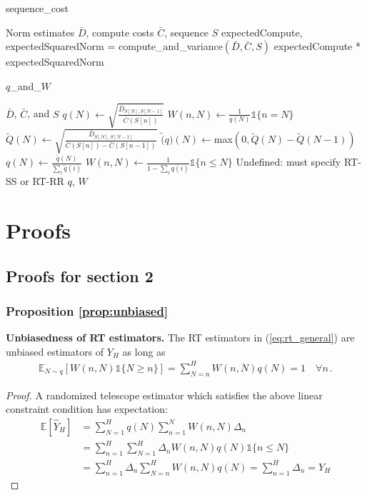 \begin{algorithm}[H]
   \caption{sequence\_cost}
   \label{alg:cost}
\begin{algorithmic}
    Norm estimates $\bar{D}$, compute costs $\bar{C}$, sequence $S$
   \STATE expectedCompute, expectedSquaredNorm = compute\_and\_variance$(\bar{D}, \bar{C}, S)$
    expectedCompute * expectedSquaredNorm
\end{algorithmic}
\end{algorithm}


\begin{algorithm}[H]
   \caption{$q$\_and\_$W$}
   \label{alg:qandw}
\begin{algorithmic}
    $\bar{D}$, $\bar{C}$, and $S$
   \STATE $q(N) \leftarrow \sqrt{\frac{\bar{D}_{S[N], S[N-1]}}{\bar{C}(S[n])}}$
   \STATE $W(n, N) \leftarrow \frac{1}{q(N)} \mathds{1}\{n=N\}$
   \STATE $\tilde{Q}(N) \leftarrow \sqrt{\frac{\bar{D}_{S[N], S[N-1]}}{\bar{C}(S[n]) - \bar{C}(S[n-1])}}$
   \STATE $\tilde(q)(N) \leftarrow $max$(0, \tilde{Q}(N) - \tilde{Q}(N-1))$
   \STATE $q(N) \leftarrow \frac{\tilde{q}(N)}{\sum_i \tilde{q}(i)}$
   \STATE $W(n, N) \leftarrow \frac{1}{1 - \sum_i q(i)} \mathds{1}\{n \leq N\}$
   \ELSE
   \STATE Undefined: must specify RT-SS or RT-RR
   \ENDIF
    $q$, $W$
\end{algorithmic}
\end{algorithm}
\clearpage
\section{Proofs}

\subsection{Proofs for section 2}
\subsubsection{Proposition \ref{prop:unbiased}}
\textbf{Unbiasedness of RT estimators.}
The RT estimators in (\ref{eq:rt_general}) are unbiased estimators of
$Y_H$ as long as
\begin{align*}
\mathbb{E}_{N\sim q} [W(n, N) \mathds{1}\{N \geq n\}] = \sum_{N=n}^H W(n, N)q(N) = 1 \quad \forall n\,.
\end{align*}

\begin{proof}
A randomized telescope estimator which satisfies the above linear constraint condition has expectation:
\begin{align*}
\mathbb{E} [\hat{Y}_H] &= \sum_{N=1}^H q(N) \sum_{n=1}^N W(n, N) \Delta_n\\
&= \sum_{n=1}^H \sum_{N=1}^H \Delta_n W(n, N) q(N)\mathds{1}\{n \leq N\}\\
&= \sum_{n=1}^H \Delta_n \sum_{N=n}^H W(n, N) q(N) = \sum_{n=1}^H \Delta_n = Y_H
\end{align*}
\end{proof}

